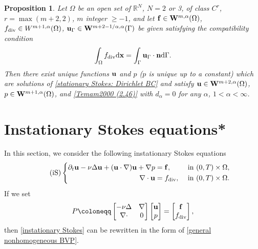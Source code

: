 \documentclass[oneside,11pt]{book}
\numberwithin{equation}{section}
\newtheorem{proposition}{Proposition}[section]
\begin{document}
\begin{proposition}
    Let $\Omega$ be an open set of $\mathbb{R}^N$, $N = 2$ or 3, of class $C^r$, $r = \max(m + 2,2)$, $m$ integer $\ge -1$, and let ${\bf f}\in{\bf W}^{m,\alpha}(\Omega)$, $f_{\rm div}\in W^{m+1,\alpha}(\Omega)$, ${\bf u}_\Gamma\in{\bf W}^{m + 2 - 1/\alpha,\alpha}(\Gamma)$ be given satisfying the compatibility condition
    \begin{align*}
        \int_\Omega f_{\rm div}{\rm d}{\bf x} = \int_\Gamma {\bf u}_\Gamma\cdot{\bf n}{\rm d}\Gamma.
    \end{align*}
    Then there exist unique functions ${\bf u}$ and $p$ ($p$ is unique up to a constant) which are solutions of \eqref{stationary Stokes: Dirichlet BC} and satisfy ${\bf u}\in{\bf W}^{m+2,\alpha}(\Omega)$, $p\in{\bf W}^{m+1,\alpha}(\Omega)$, and \eqref{Temam2000 (2.46)} with $d_\alpha = 0$ for any $\alpha$, $1 < \alpha < \infty$.
\end{proposition}

\section{Instationary Stokes equations*}
In this section, we consider the following instationary Stokes equations
\begin{equation}
    \label{instationary Stokes}
    \tag{iS}
    \left\{\begin{split}
        \partial_t{\bf u} - \nu\Delta{\bf u} + ({\bf u}\cdot\nabla){\bf u} + \nabla p &= {\bf f},&&\mbox{ in }(0,T)\times\Omega,\\
        \nabla\cdot{\bf u} &= f_{\rm div},&&\mbox{ in }(0,T)\times\Omega.
    \end{split}\right.
\end{equation}
If we set
\begin{align*}
    P\coloneqq\begin{bmatrix}
        -\nu\Delta & \nabla\\ \nabla\cdot & 0
    \end{bmatrix}\begin{bmatrix}
        {\bf u}\\ p
    \end{bmatrix} = \begin{bmatrix}
        {\bf f}\\ f_{\rm div}
    \end{bmatrix},
\end{align*}
then \eqref{instationary Stokes} can be rewritten in the form of \eqref{general nonhomogeneous BVP}.
\end{document}
